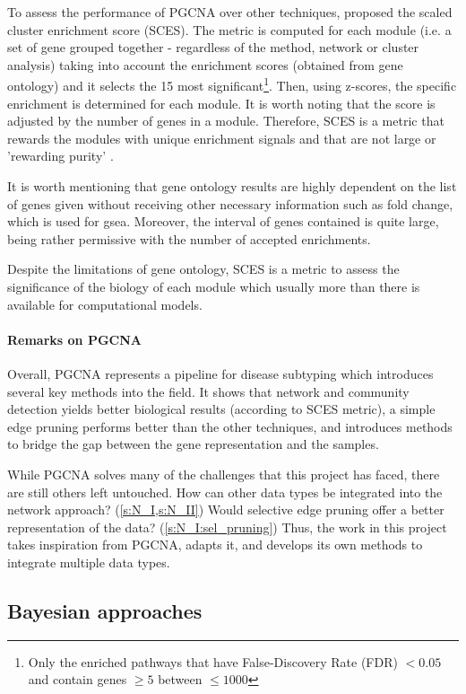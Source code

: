 To assess the performance of PGCNA over other techniques, \citet{Care2019-ij} proposed the scaled cluster enrichment score (SCES). The metric is computed for each module (i.e. a set of gene grouped together - regardless of the method, network or cluster analysis) taking into account the enrichment scores (obtained from gene ontology) and it selects the 15 most significant\footnote{Only the enriched pathways that have False-Discovery Rate (FDR) $<0.05$ and contain genes $\geq5$ between $\leq1000$}. Then, using z-scores, the specific enrichment is determined for each module. It is worth noting that the score is adjusted by the number of genes in a module. Therefore, SCES is a metric that rewards the modules with unique enrichment signals and that are not large or 'rewarding purity' \citep{Care2019-ij}.

It is worth mentioning that gene ontology results are highly dependent on the list of genes given without receiving other necessary information such as fold change, which is used for \acrlong{gsea}. Moreover, the interval of genes contained is quite large, being rather permissive with the number of accepted enrichments.

Despite the limitations of gene ontology, SCES is a metric to assess the significance of the biology of each module which usually more than there is available for computational models.


\paragraph*{Remarks on PGCNA}

Overall, PGCNA represents a pipeline for disease subtyping which introduces several key methods into the field. It shows that network and community detection yields better biological results (according to SCES metric), a simple edge pruning performs better than the other techniques, and introduces methods to bridge the gap between the gene representation and the samples.

While PGCNA solves many of the challenges that this project has faced, there are still others left untouched. How can other data types be integrated into the network approach? (\cref{s:N_I,s:N_II}) Would selective edge pruning offer a better representation of the data? (\cref{s:N_I:sel_pruning}) Thus, the work in this project takes inspiration from PGCNA, adapts it, and develops its own methods to integrate multiple data types.

\subsection{Bayesian approaches} \label{s:lit:bayesian}

